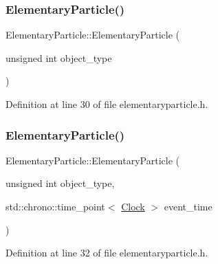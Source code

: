 \subsubsection{\texorpdfstring{Elementary\+Particle()}{ElementaryParticle()}\hspace{0.1cm}{\footnotesize\ttfamily [2/4]}}
{\footnotesize\ttfamily Elementary\+Particle\+::\+Elementary\+Particle (\begin{DoxyParamCaption}\item[{unsigned int}]{object\+\_\+type }\end{DoxyParamCaption})\hspace{0.3cm}{\ttfamily [inline]}}



Definition at line 30 of file elementaryparticle.\+h.

\mbox{\label{class_elementary_particle_a371e2742ab8b5ce0fe55ef4adbaed3af}} 
\subsubsection{\texorpdfstring{Elementary\+Particle()}{ElementaryParticle()}\hspace{0.1cm}{\footnotesize\ttfamily [3/4]}}
{\footnotesize\ttfamily Elementary\+Particle\+::\+Elementary\+Particle (\begin{DoxyParamCaption}\item[{unsigned int}]{object\+\_\+type,  }\item[{std\+::chrono\+::time\+\_\+point$<$ \mbox{\hyperlink{universe_8h_a0ef8d951d1ca5ab3cfaf7ab4c7a6fd80}{Clock}} $>$}]{event\+\_\+time }\end{DoxyParamCaption})\hspace{0.3cm}{\ttfamily [inline]}}



Definition at line 32 of file elementaryparticle.\+h.

\mbox{\label{class_elementary_particle_a0b43033247b36096d0de2a7553c620a9}} 
